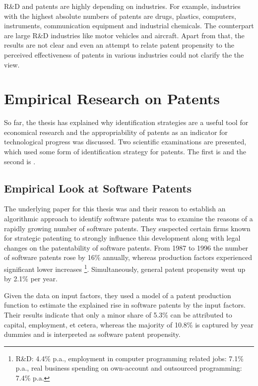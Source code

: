 \documentclass[12pt, a4paper, abstract, parskip]{scrartcl}
\theoremstyle{definition}
\begin{document}
R\&D and patents are highly depending on industries. For example, industries
with the highest absolute numbers of patents are drugs, plastics, computers,
instruments, communication equipment and industrial chemicals. The counterpart
are large R\&D industries like motor vehicles and aircraft. Apart from that,
the results are not clear and even an attempt to relate patent propensity to
the perceived effectiveness of patents in various industries could not clarify
the the view.



\section{Empirical Research on Patents} %
\label{sec:empirical_research_on_patents}

So far, the thesis has explained why identification strategies are a useful
tool for economical research and the appropriability of patents as an indicator
for technological progress was discussed. Two scientific examinations are
presented, which used some form of identification strategy for patents. The
first is \citet{bessen2007empirical} and the second is \cite{graham2013smart}.

\subsection{Empirical Look at Software Patents} %
\label{sub:empirical_look_at_software_patents}

The underlying paper for this thesis was \cite{bessen2007empirical} and their
reason to establish an algorithmic approach to identify software patents was to
examine the reasons of a rapidly growing number of software patents. They
suspected certain firms known for strategic patenting to strongly influence
this development along with legal changes on the patentability of software
patents. From 1987 to 1996 the number of software patents rose by 16\%
annually, whereas production factors experienced significant lower increases
\footnote{R\&D: 4.4\% p.a., employment in computer programming related jobs:
7.1\% p.a., real business spending on own-account and outsourced programming:
7.4\% p.a.}. Simultaneously, general patent propensity went up by 2.1\% per
year.

Given the data on input factors, they used a model of a patent production
function to estimate the explained rise in software patents by the input
factors. Their results indicate that only a minor share of 5.3\% can be
attributed to capital, employment, et cetera, whereas the majority of 10.8\% is
captured by year dummies and is interpreted as software patent propensity.
\end{document}
